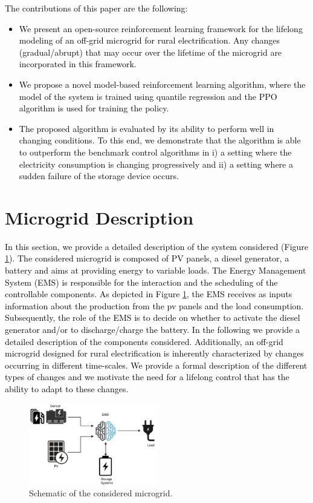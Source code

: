 \documentclass{article}
\begin{document}
	\textcolor{black}{The contributions of this paper are the following:
	\begin{itemize}
	    \item We present an open-source reinforcement learning framework for the lifelong modeling of an off-grid microgrid for rural electrification. Any changes (gradual/abrupt) that may occur over the lifetime of the microgrid are incorporated in this framework.
	    \item We propose a novel model-based reinforcement learning algorithm, where the model of the system is trained using quantile regression and the PPO algorithm is used for training the policy.
	    \item The proposed algorithm is evaluated by its ability to perform well in changing conditions. To this end, we demonstrate that the algorithm is able to outperform the benchmark control algorithms in i) a setting where the electricity consumption is changing progressively and ii) a setting where a sudden failure of the storage device occurs.
	\end{itemize}
	}

\section{Microgrid Description}\label{sec: Simulator}
    \label{sec:gym}
    \textcolor{black}{In this section, we provide a detailed description of the system considered (Figure \ref{fig:MG}). The considered microgrid is composed of PV panels, a diesel generator, a battery and aims at providing energy to variable loads. The Energy Management System (EMS) is responsible for the interaction and the scheduling of the controllable components. As depicted in Figure \ref{fig:MG}, the EMS receives as inputs information about the production from the pv panels and the load consumption. Subsequently, the role of the EMS is to decide on whether to activate the diesel generator and/or to discharge/charge the battery. In the following we provide a detailed description of the components considered. Additionally, an off-grid microgrid designed for rural electrification is inherently characterized by changes occurring in different time-scales. We provide a formal description of the different types of changes and we motivate the need for a lifelong control that has the ability to adapt to these changes.}
    
    \begin{figure}[h!]
	\includegraphics[width=0.5\textwidth]{microg.pdf}
	\centering
	\caption{Schematic of the considered microgrid.}
	\label{fig:MG}
    \end{figure}
    
\end{document}
